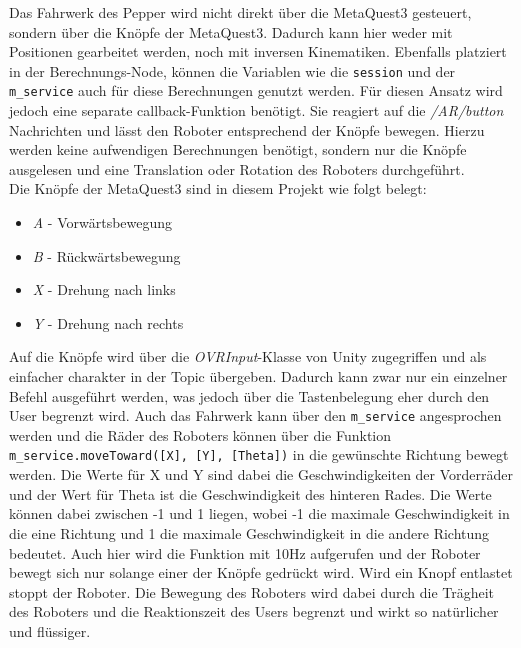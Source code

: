 Das Fahrwerk des Pepper wird nicht direkt über die MetaQuest3 gesteuert, sondern über die Knöpfe der MetaQuest3. Dadurch kann hier weder mit Positionen gearbeitet werden, noch mit inversen Kinematiken. Ebenfalls platziert in der Berechnungs-Node, können die Variablen wie die \texttt{session} und der \texttt{m\_service} auch für diese Berechnungen genutzt werden. Für diesen Ansatz wird jedoch eine separate callback-Funktion benötigt. Sie reagiert auf die \textit{/AR/button} Nachrichten und lässt den Roboter entsprechend der Knöpfe bewegen. Hierzu werden keine aufwendigen Berechnungen benötigt, sondern nur die Knöpfe ausgelesen und eine Translation oder Rotation des Roboters durchgeführt.\\
Die Knöpfe der MetaQuest3 sind in diesem Projekt wie folgt belegt:
\begin{itemize}
    \item \textit{A} - Vorwärtsbewegung
    \item \textit{B} - Rückwärtsbewegung
    \item \textit{X} - Drehung nach links
    \item \textit{Y} - Drehung nach rechts
\end{itemize}
Auf die Knöpfe wird über die \textit{OVRInput}-Klasse von Unity zugegriffen und als einfacher charakter in der Topic übergeben. Dadurch kann zwar nur ein einzelner Befehl ausgeführt werden, was jedoch über die Tastenbelegung eher durch den User begrenzt wird. Auch das Fahrwerk kann über den \texttt{m\_service} angesprochen werden und die Räder des Roboters können über die Funktion \texttt{m\_service.moveToward([X], [Y], [Theta])} in die gewünschte Richtung bewegt werden. Die Werte für X und Y sind dabei die Geschwindigkeiten der Vorderräder und der Wert für Theta ist die Geschwindigkeit des hinteren Rades. Die Werte können dabei zwischen -1 und 1 liegen, wobei -1 die maximale Geschwindigkeit in die eine Richtung und 1 die maximale Geschwindigkeit in die andere Richtung bedeutet. Auch hier wird die Funktion mit 10Hz aufgerufen und der Roboter bewegt sich nur solange einer der Knöpfe gedrückt wird. Wird ein Knopf entlastet stoppt der Roboter. Die Bewegung des Roboters wird dabei durch die Trägheit des Roboters und die Reaktionszeit des Users begrenzt und wirkt so natürlicher und flüssiger.\\
